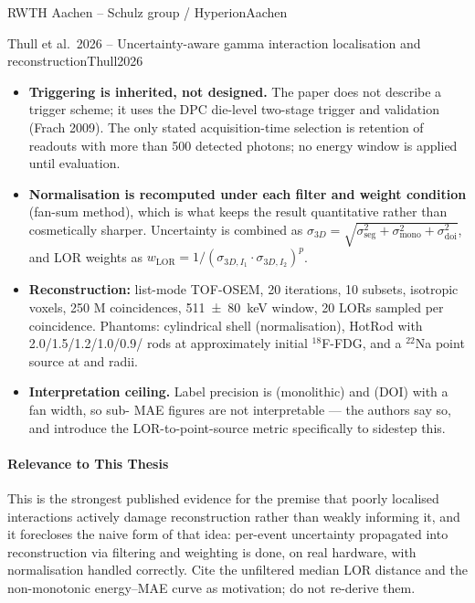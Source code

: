 \begin{programnote}{RWTH Aachen -- Schulz group / Hyperion}{Aachen}
\begin{papernote}{Thull et al.\ 2026 -- Uncertainty-aware gamma interaction localisation and reconstruction}{Thull2026}
\begin{itemize}
    \item \textbf{Triggering is inherited, not designed.} The paper does not describe a
        trigger scheme; it uses the DPC die-level two-stage trigger and validation (Frach
        2009). The only stated acquisition-time selection is retention of readouts with
        more than 500 detected photons; no energy window is applied until evaluation.
    \item \textbf{Normalisation is recomputed under each filter and weight condition}
        (fan-sum method), which is what keeps the result quantitative rather than
        cosmetically sharper. Uncertainty is combined as
        $\sigma_{3D} = \sqrt{\sigma^2_{\mathrm{seg}} + \sigma^2_{\mathrm{mono}} +
        \sigma^2_{\mathrm{doi}}}$, and LOR weights as
        $w_{\mathrm{LOR}} = 1 / (\sigma_{3D,I_1} \cdot \sigma_{3D,I_2})^p$.
    \item \textbf{Reconstruction:} list-mode TOF-OSEM, 20 iterations, 10 subsets,
         isotropic voxels, 250 M coincidences,
        \qty[separate-uncertainty=true]{511 \pm 80}{\kilo\electronvolt} window,
        20 LORs sampled per coincidence. Phantoms: cylindrical shell (normalisation),
        HotRod with 2.0/1.5/1.2/1.0/0.9/ rods at approximately  initial
        $^{18}$F-FDG, and a  $^{22}$Na point source at  and  radii.
    \item \textbf{Interpretation ceiling.} Label precision is  (monolithic) and
         (DOI) with a  fan width, so sub- MAE figures are not
        interpretable --- the authors say so, and introduce the LOR-to-point-source metric
        specifically to sidestep this.
\end{itemize}

\paragraph{Relevance to This Thesis}
This is the strongest published evidence for the premise that poorly localised
interactions actively damage reconstruction rather than weakly informing it, and it
forecloses the naive form of that idea: per-event uncertainty propagated into
reconstruction via filtering and weighting is done, on real hardware, with normalisation
handled correctly. Cite the  unfiltered median LOR distance and the non-monotonic
energy--MAE curve as motivation; do not re-derive them.


\end{papernote}
\end{programnote}
